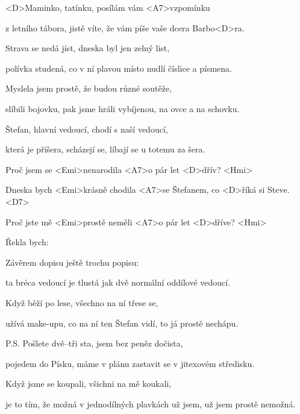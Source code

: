 

\zs
<D>Maminko, tatínku, posílám vám <A7>vzpomínku

z letního tábora, jistě víte, že vám píše vaše dcera Barbo<D>ra.
\ks

\zs
Strava se nedá jíst, dneska byl jen zelný list,

polívka studená, co v ní plavou místo nudlí číslice a písmena.
\ks

\zs
Myslela jsem prostě, že budou různé soutěže,

slíbili bojovku, pak jsme hráli vybíjenou, na ovce a na schovku.
\ks

\zs
Štefan, hlavní vedoucí, chodí s naší vedoucí,

která je příšera, scházejí se, líbají se u totemu za šera.
\ks

\zr
Proč jsem se <Emi>nenarodila <A7>o pár let <D>dřív? <Hmi>

Dneska bych <Emi>krásně chodila <A7>se Štefanem, co <D>říká si Steve. <D7>

Proč jste mě <Emi>prostě neměli <A7>o pár let <D>dříve? <Hmi>

Řekla bych: 
\kr

\zs
Závěrem dopisu ještě trochu popisu:

ta bréca vedoucí je tlustá jak dvě normální oddílové vedoucí.
\ks

\zs
Když běží po lese, všechno na ní třese se,

užívá make-upu, co na ní ten Štefan vidí, to já prostě nechápu.
\ks

\zr \kr

\zs
P.S. Pošlete dvě--tři sta, jsem bez peněz dočista,

pojedem do Písku, máme v plánu zastavit se v jitexovém středisku.
\ks

\zs
Když jsme se koupali, všichni na mě koukali,

je to tím, že možná v jednodílných plavkách už jsem, už jsem prostě nemožná.
\ks

\zr \kr

\kp
